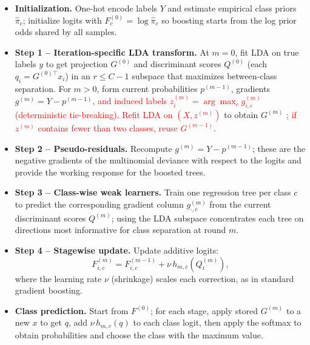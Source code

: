 \documentclass[11pt,a4paper]{article}
\providecommand{\DIFaddtex}[1]{\textcolor{red}{#1}} %
\providecommand{\DIFaddbegin}{} %
\providecommand{\DIFaddend}{} %
\providecommand{\DIFadd}[1]{\texorpdfstring{\DIFaddtex{#1}}{#1}} %
\begin{document}
\begin{itemize}
    \item \textbf{Initialization.} One-hot encode labels $Y$ and estimate empirical class priors $\hat{\pi}_c$; initialize logits with $F^{(0)}_c = \log \hat{\pi}_c$ so boosting starts from the log prior odds shared by all samples.

    \item \textbf{Step 1 – Iteration-specific LDA transform.} At $m=0$, fit LDA on true labels $y$ to get projection $G^{(0)}$ and discriminant scores $Q^{(0)}$ (each $q_i = G^{(0)\top} x_i$) in an $r \le C-1$ subspace that maximizes between-class separation.  
    For $m>0$, form current probabilities $p^{(m-1)}$, gradients $g^{(m)} = Y - p^{(m-1)}$,  \DIFaddbegin \DIFadd{and induced labels $z_i^{(m)}=\arg\max_c g^{(m)}_{i,c}$ (deterministic tie-breaking). Refit LDA on $(X,z^{(m)})$ }\DIFaddend to obtain $G^{(m)}$ \DIFaddbegin \DIFadd{; if $z^{(m)}$ contains fewer than two classes, reuse $G^{(m-1)}$}\DIFaddend .

    \item \textbf{Step 2 – Pseudo-residuals.} Recompute $g^{(m)} = Y - p^{(m-1)}$; these are the negative gradients of the multinomial deviance with respect to the logits and provide the working response for the boosted trees.

    \item \textbf{Step 3 – Class-wise weak learners.} Train one regression tree per class $c$ to predict the corresponding gradient column $g^{(m)}_{\cdot,c}$ from the current discriminant scores $Q^{(m)}$; using the LDA subspace concentrates each tree on directions most informative for class separation at round $m$.

    \item \textbf{Step 4 – Stagewise update.} Update additive logits:
    \[
    F^{(m)}_{i,c} = F^{(m-1)}_{i,c} + \nu \, h_{m,c}\left(Q^{(m)}_i\right),
    \]
    where the learning rate $\nu$ (shrinkage) scales each correction, as in standard gradient boosting.

    \item \textbf{Class prediction.} Start from $F^{(0)}$; for each stage, apply stored $G^{(m)}$ to a new $x$ to get $q$, add $\nu \, h_{m,c}(q)$ to each class logit, then apply the softmax to obtain probabilities and choose the class with the maximum value.
\end{itemize}
\end{document}

